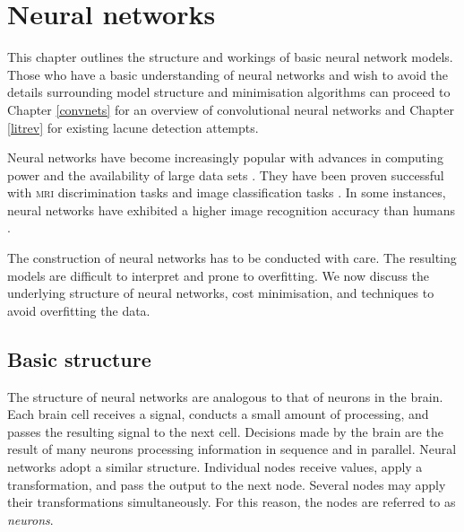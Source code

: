 %
%

\chapter{Neural networks}\label{neuralNets-intro}

This chapter outlines the structure and workings of basic neural network models. Those who have a basic understanding of neural networks and wish to avoid the details surrounding model structure and minimisation algorithms can proceed to Chapter \ref{convnets} for an overview of convolutional neural networks and Chapter \ref{litrev} for existing lacune detection attempts.

% 
% 

Neural networks have become increasingly popular with advances in computing power and the availability of large data sets \citep{Goodfellow-et-al-2016}. They have been proven successful with \textsc{mri} discrimination tasks \citep{DouQ.2016ADoC, Yokoyama2007} and image classification tasks \citep{HeKaiming2015DDiR, AlexNet2012, GoogLeNet2015}. In some instances, neural networks have exhibited a higher image recognition accuracy than humans \citep{HeKaiming2015DDiR}.

The construction of neural networks has to be conducted with care. The resulting models are difficult to interpret and prone to overfitting. We now discuss the underlying structure of neural networks, cost minimisation, and techniques to avoid overfitting the data.

\section{Basic structure}\label{nnets-structure}

The structure of neural networks are analogous to that of neurons in the brain. Each brain cell receives a signal, conducts a small amount of processing, and passes the resulting signal to the next cell. Decisions made by the brain are the result of many neurons processing information in sequence and in parallel. Neural networks adopt a similar structure. Individual nodes receive values, apply a transformation, and pass the output to the next node. Several nodes may apply their transformations simultaneously. For this reason, the nodes are referred to as \textit{neurons}.

